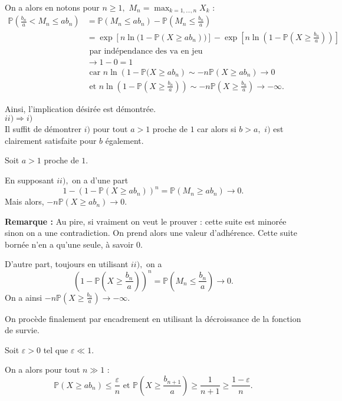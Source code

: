 On a alors en notons pour $n\geq 1,$ $\displaystyle M_{n}=\max_{k=1,\ldots,n}X_{k}$ :
\begin{align*}
\mathbb{P}(\frac{b_{n}}{a}< M_{n} \leq ab_{n}) & = \mathbb{P}(M_{n}\leq ab_{n})-\mathbb{P}(M_{n}\leq \frac{b_{n}}{a})\\
& =\exp\left[ n\ln \big(1-\mathbb{P}(X\geq ab_{n})\big) \right]-\exp\left[ n\ln \left(1-\mathbb{P}(X\geq \frac{b_{n}}{a})\right) \right]\\
& \mbox{ par indépendance des va en jeu}\\
& \longrightarrow 1-0=1\\ 
& \mbox{ car } n\ln\left( 1-\mathbb{P}(X\geq ab_{n}\right)\sim -n\mathbb{P}(X\geq ab_{n})\longrightarrow 0\\
& \mbox{ et } n\ln \left (1-\mathbb{P}(X\geq \frac{b_{n}}{a})\right)\sim -n\mathbb{P}(X\geq \frac{b_{n}}{a})\longrightarrow -\infty.
\end{align*}

Ainsi, l'implication désirée est démontrée.
\\

$\boxed{ii)\Longrightarrow i)}$\\

Il suffit de démontrer $i)$ pour tout $a>1$ proche de $1$ car alors si $b>a,$ $i)$ est clairement satisfaite pour $b$ également.

Soit $a>1$ proche de $1.$ 

En supposant $ii),$ on a d'une part $$1-\left(1-\mathbb{P}(X\geq ab_{n})\right)^{n}=\mathbb{P}(M_{n}\geq ab_{n})\longrightarrow 0.$$
Mais alors, $\displaystyle -n\mathbb{P}(X\geq ab_{n})\longrightarrow 0.$ 

\textbf{Remarque : } Au pire, si vraiment on veut le prouver  : cette suite est minorée sinon on a une contradiction. On prend alors une valeur d'adhérence. Cette suite bornée n'en a qu'une seule, à savoir $0.$

D'autre part, toujours en utilisant $ii),$ on a $$\left(1-\mathbb{P}(X\geq \frac{b_{n}}{a})\right)^{n}=\mathbb{P}(M_{n}\leq \frac{b_{n}}{a})\longrightarrow 0.$$
On a ainsi $\displaystyle -n\mathbb{P}(X\geq \frac{b_{n}}{a})\longrightarrow -\infty.$

On procède finalement par encadrement en utilisant la décroissance de la fonction de survie.

Soit $\varepsilon>0$ tel que $\varepsilon\ll 1.$ 

On a alors pour tout $n\gg 1$ : $$\mathbb{P}(X\geq ab_{n})\leq \frac{\varepsilon}{n} \mbox{ et } \mathbb{P}(X\geq \frac{b_{n+1}}{a})\geq \frac{1}{n+1}\geq \frac{1-\varepsilon}{n}.$$

